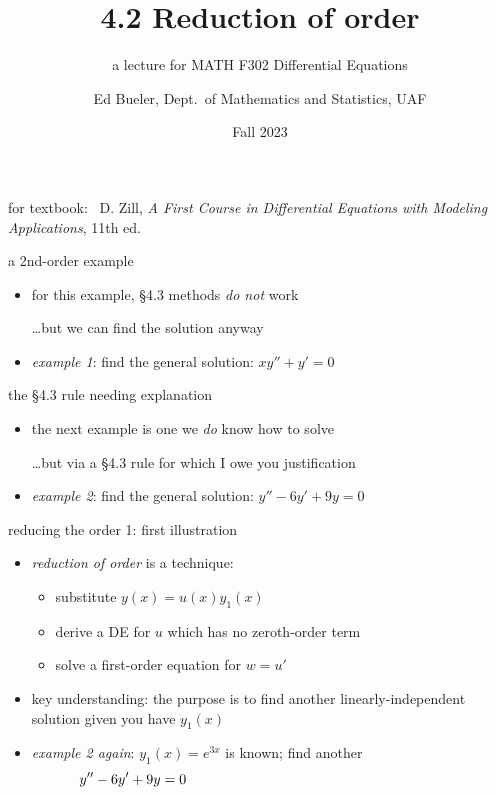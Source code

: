 \documentclass[dvipsnames]{beamer}
\title{4.2 Reduction of order}
\subtitle{a lecture for MATH F302 Differential Equations}
\author{Ed Bueler, Dept.~of Mathematics and Statistics, UAF}
\date{Fall 2023}
\begin{document}


\begin{frame}
\titlepage

\centerline{\tiny for textbook: \, D. Zill, \emph{A First Course in Differential Equations with Modeling Applications}, 11th ed.}
\end{frame}



\begin{frame}{a 2nd-order example}

\begin{itemize}
\item for this example, \S4.3 methods \emph{do not} work

\dots but we can find the solution anyway
\item \emph{example 1}: find the general solution: \quad $x y'' + y' = 0$
\end{itemize}

\vspace{60mm}
\end{frame}


\begin{frame}{the \S4.3 rule needing explanation}

\begin{itemize}
\item the next example is one we \emph{do} know how to solve

\dots but via a \S4.3 rule for which I owe you justification
\item \emph{example 2}:  find the general solution: \quad $y'' - 6 y' + 9 y = 0$
\end{itemize}

\vspace{60mm}
\end{frame}


\begin{frame}{reducing the order 1: first illustration}

\begin{itemize}
\item \emph{reduction of order} is a technique:
    \begin{itemize}
    \item substitute $y(x) = u(x) y_1(x)$
    \item derive a DE for $u$ which has no zeroth-order term
    \item solve a first-order equation for $w=u'$
    \end{itemize}
\item key understanding: the \alert{purpose} is to \alert{find another linearly-independent solution} given you have $y_1(x)$
\item \emph{example 2 again}:  $y_1(x)=e^{3x}$ is known; find another
    $$y'' - 6 y' + 9 y = 0 \hspace{70mm}$$
\end{itemize}

\vspace{50mm}
\end{frame}
\end{document}
